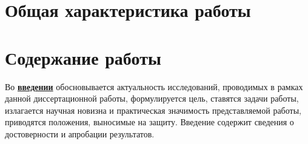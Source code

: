 \section*{Общая характеристика работы}

\newcommand{\actuality}{\pdfbookmark[1]{Актуальность}{actuality}\underline{\textbf{\actualityTXT}}}
\newcommand{\progress}{\pdfbookmark[1]{Разработанность темы}{progress}\underline{\textbf{\progressTXT}}}
\newcommand{\aim}{\pdfbookmark[1]{Цели}{aim}\underline{{\textbf\aimTXT}}}
\newcommand{\tasks}{\pdfbookmark[1]{Задачи}{tasks}\underline{\textbf{\tasksTXT}}}
\newcommand{\aimtasks}{\pdfbookmark[1]{Цели и задачи}{aimtasks}\aimtasksTXT}
\newcommand{\novelty}{\pdfbookmark[1]{Научная новизна}{novelty}\underline{\textbf{\noveltyTXT}}}
\newcommand{\influence}{\pdfbookmark[1]{Практическая значимость}{influence}\underline{\textbf{\influenceTXT}}}
\newcommand{\methods}{\pdfbookmark[1]{Методология и методы исследования}{methods}\underline{\textbf{\methodsTXT}}}
\newcommand{\defpositions}{\pdfbookmark[1]{Положения, выносимые на защиту}{defpositions}\underline{\textbf{\defpositionsTXT}}}
\newcommand{\reliability}{\pdfbookmark[1]{Достоверность}{reliability}\underline{\textbf{\reliabilityTXT}}}
\newcommand{\probation}{\pdfbookmark[1]{Апробация}{probation}\underline{\textbf{\probationTXT}}}
\newcommand{\contribution}{\pdfbookmark[1]{Личный вклад}{contribution}\underline{\textbf{\contributionTXT}}}
\newcommand{\publications}{\pdfbookmark[1]{Публикации}{publications}\underline{\textbf{\publicationsTXT}}}




\section*{Содержание работы}
Во \underline{\textbf{введении}} обосновывается актуальность исследований, проводимых в рамках данной диссертационной работы, формулируется цель, ставятся задачи работы, излагается научная новизна и практическая значимость представляемой работы, приводятся положения, выносимые на защиту. Введение содержит сведения о достоверности и апробации результатов.

